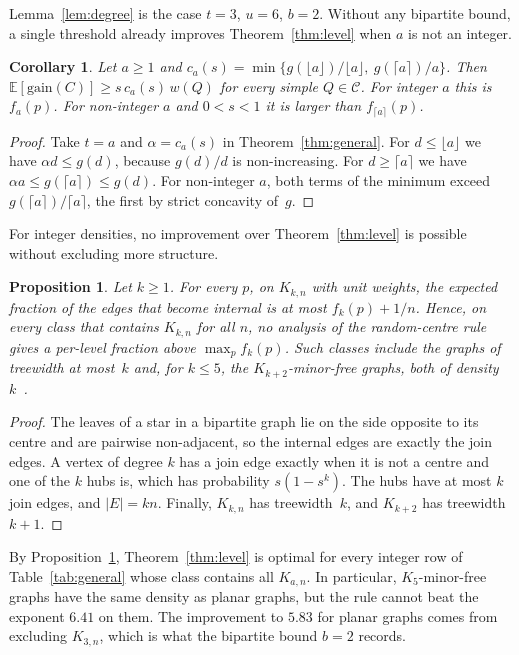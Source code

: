 \documentclass[11pt]{article}
\newtheorem{corollary}[theorem]{Corollary}
\newtheorem{proposition}[theorem]{Proposition}
\theoremstyle{remark}
\newcommand{\E}{\mathbb{E}}
\begin{document}
Lemma~\ref{lem:degree} is the case $t=3$, $u=6$, $b=2$. Without any bipartite bound, a single
threshold already improves Theorem~\ref{thm:level} when $a$ is not an integer.

\begin{corollary}\label{cor:aonly}
Let $a\ge1$ and $c_a(s)=\min\{g(\lfloor a\rfloor)/\lfloor a\rfloor,\ g(\lceil a\rceil)/a\}$. Then
$\E[\mathrm{gain}(C)]\ge s\,c_a(s)\,w(Q)$ for every simple $Q\in\mathcal C$. For integer $a$ this is
$f_a(p)$. For non-integer $a$ and $0<s<1$ it is larger than $f_{\lceil a\rceil}(p)$.
\end{corollary}
\begin{proof}
Take $t=a$ and $\alpha=c_a(s)$ in Theorem~\ref{thm:general}. For $d\le\lfloor a\rfloor$ we have
$\alpha d\le g(d)$, because $g(d)/d$ is non-increasing. For $d\ge\lceil a\rceil$ we have $\alpha
a\le g(\lceil a\rceil)\le g(d)$. For non-integer $a$, both terms of the minimum exceed
$g(\lceil a\rceil)/\lceil a\rceil$, the first by strict concavity of~$g$.
\end{proof}

For integer densities, no improvement over Theorem~\ref{thm:level} is possible without excluding
more structure.

\begin{proposition}\label{prop:kkn}
Let $k\ge1$. For every $p$, on $K_{k,n}$ with unit weights, the expected fraction of the edges that
become internal is at most $f_k(p)+1/n$. Hence, on every class that contains $K_{k,n}$ for all $n$,
no analysis of the random-centre rule gives a per-level fraction above $\max_pf_k(p)$. Such classes
include the graphs of treewidth at most~$k$ and, for $k\le5$, the $K_{k+2}$-minor-free graphs, both
of density~$k$~\cite{M68}.
\end{proposition}
\begin{proof}
The leaves of a star in a bipartite graph lie on the side opposite to its centre and are pairwise
non-adjacent, so the internal edges are exactly the join edges. A vertex of degree $k$ has a join
edge exactly when it is not a centre and one of the $k$ hubs is, which has probability $s(1-s^k)$.
The hubs have at most $k$ join edges, and $|E|=kn$. Finally, $K_{k,n}$ has treewidth~$k$, and
$K_{k+2}$ has treewidth $k+1$.
\end{proof}

By Proposition~\ref{prop:kkn}, Theorem~\ref{thm:level} is optimal for every integer row of Table~\ref{tab:general} whose class
contains all $K_{a,n}$. In particular, $K_5$-minor-free graphs have the same density as planar
graphs, but the rule cannot beat the exponent $6.41$ on them. The improvement to $5.83$ for planar
graphs comes from excluding $K_{3,n}$, which is what the bipartite bound $b=2$ records.
\end{document}
